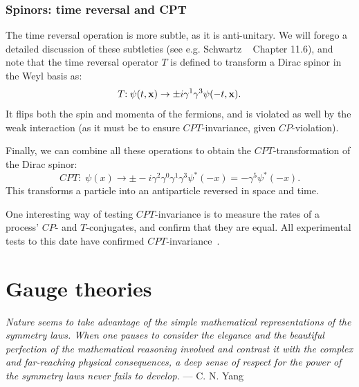 \subsubsection{Spinors: time reversal and CPT}

The time reversal operation is more subtle, as it is anti-unitary.
We will forego a detailed discussion of these subtleties (see e.g. Schwartz ~\cite{Schwartz:2014sze} Chapter 11.6), and note that the time reversal operator $T$ is defined to transform a Dirac spinor in the Weyl basis as:
\begin{equation}
	\label{eq:01_qft_spinors_cpt_time_reversal}
	T\mathrm{:\;} \psi(t, \mathbf{x}) \rightarrow \pm i\gamma^1\gamma^3\psi(-t, \mathbf{x}).
\end{equation}
It flips both the spin and momenta of the fermions, and is violated as well by the weak interaction (as it must be to ensure $CPT$-invariance, given $CP$-violation).

Finally, we can combine all these operations to obtain the $CPT$-transformation of the Dirac spinor:
\begin{equation}
	\label{eq:01_qft_spinors_cpt_cpt}
	CPT\mathrm{:\;} \psi(x) \rightarrow \pm -i\gamma^2\gamma^0\gamma^1\gamma^3\psi^*(-x) = -\gamma^5\psi^*(-x).
\end{equation}
This transforms a particle into an antiparticle reversed in space and time.

One interesting way of testing $CPT$-invariance is to measure the rates of a process' $CP$- and $T$-conjugates, and confirm that they are equal.
All experimental tests to this date have confirmed $CPT$-invariance~\cite{ParticleDataGroup:2024cfk}.


\section{Gauge theories}
\label{sec:01_qft_gt}

{
	\noindent
	\textit{Nature seems to take advantage of the simple mathematical representations of the symmetry laws.
	When one pauses to consider the elegance and the beautiful perfection of the mathematical reasoning involved and contrast it with the complex and far-reaching physical consequences, a deep sense of respect for the power of the symmetry laws never fails to develop.} --- C. N. Yang
}

\

